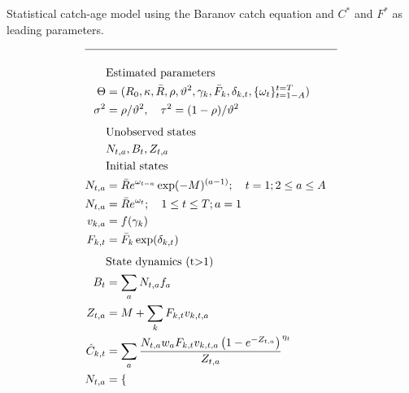 \begin{multicols}{2}
\begin{tablehere}
  \centering
\caption{Statistical catch-age model using the Baranov catch
equation and $C^*$ and $F^*$ as leading parameters.}\label{Table4}
\tableEq
    \begin{align}
        \hline \nonumber \\
        &\mbox{Estimated parameters} \nonumber\\
        \Theta &= (R_0,\kappa,\bar{R},\rho,\vartheta^2,\gamma_{k},\bar{F}_k,\delta_{k,t},\{\omega_t\}_{t=1-A}^{t=T}) \label{T4.1}\\
        \sigma^2&=\rho /\vartheta^2, \quad
        \tau^2=(1-\rho)/\vartheta^2\label{T4.2}\\[1ex]
        &\mbox{Unobserved states} \nonumber\\
        &N_{t,a},B_t,Z_{t,a}	\label{T4.3}\\
        &\mbox{Initial states} \nonumber\\
        N_{t,a}&=\bar{R}e^{\omega_{t-a}} \exp(-M)^{(a-1)};\quad t=1;  2\leq a\leq A\label{T4.4}\\
        N_{t,a}&=\bar{R}e^{\omega_{t}} ;\quad 1\leq t\leq T;  a=1\label{T4.5}\\
        v_{k,a}&=f(\gamma_k) \label{T4.6}\\
        F_{k,t}&=\bar{F}_k \exp(\delta_{k,t}) \label{T4.7}\\[1ex]
        &\mbox{State dynamics (t$>$1)} \nonumber\\
        B_t&=\sum_a N_{t,a}f_a \label{T4.8}\\
        Z_{t,a}&=M+\sum_k F_{k,t} v_{k,t,a}\label{T4.9}\\
        \hat{C}_{k,t}&=\sum _ a\frac {N_{{t,a}}w_{{a}}F_{k,t} v_{{k,t,a}}
        \left( 1-{e^{-Z_{t,a}}} \right) }{Z_{t,a}}^{\eta_t} \label{T4.10}\\
        N_{t,a}&=\begin{cases}

\end{cases}
\end{align}
\end{tablehere}
\end{multicols}

